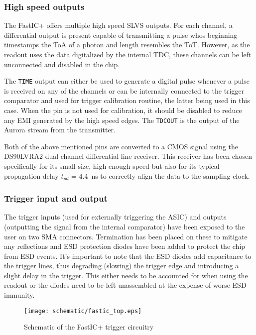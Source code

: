 \subsubsection{High speed outputs}
%
The FastIC+ offers multiple high speed SLVS outputs. For each channel, a differential output is present capable of transmitting a pulse whos beginning timestamps the ToA of a photon and length resembles the ToT. However, as the readout uses the data digitalized by the internal TDC, these channels can be left unconnected and disabled in the chip.

The \verb|TIME| output can either be used to generate a digital pulse whenever a pulse is received on any of the channels or can be internally connected to the trigger comparator and used for trigger calibration routine, the latter being used in this case. When the pin is not used for calibration, it should be disabled to reduce any EMI generated by the high speed edges. The \verb|TDCOUT| is the output of the Aurora stream from the transmitter.

Both of the above mentioned pins are converted to a CMOS signal using the DS90LVRA2 dual channel differential line receiver. This receiver has been chosen specifically for its small size, high enough speed but also for its typical propagation delay $t_{pd}$ = \SI{4.4}{\nano\second} to correctly align the data to the sampling clock.

\subsubsection{Trigger input and output}
The trigger inputs (used for externally triggering the ASIC) and outputs (outputting the signal from the internal comparator) have been exposed to the user on two SMA connectors. Termination has been placed on these to mitigate any reflections and ESD protection diodes have been added to protect the chip from ESD events. It's important to note that the ESD diodes add capacitance to the trigger lines, thus degrading (slowing) the trigger edge and introducing a slight delay in the trigger. This either needs to be accounted for when using the readout or the diodes need to be left unassembled at the expense of worse ESD immunity. 
%
\FloatBarrier
\begin{figure}[htp!]
    \centering
    \texttt{[image: schematic/fastic\_top.eps]}
    \caption{Schematic of the FastIC+ trigger circuitry}
    \label{fig:fastic_triggers}
\end{figure}
\FloatBarrier

